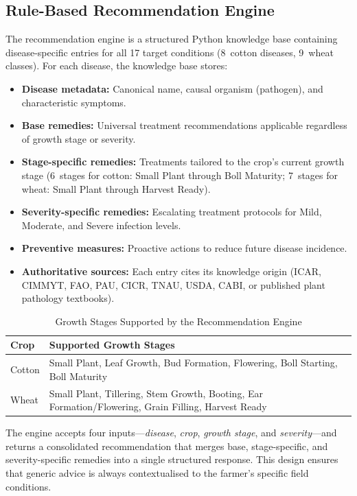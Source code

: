 \documentclass[12pt,a4paper]{report}
\begin{document}
\subsection{Rule-Based Recommendation Engine}
The recommendation engine is a structured Python knowledge base containing disease-specific entries for all 17 target conditions (8~cotton diseases, 9~wheat classes). For each disease, the knowledge base stores:

\begin{itemize}
    \item \textbf{Disease metadata:} Canonical name, causal organism (pathogen), and characteristic symptoms.
    \item \textbf{Base remedies:} Universal treatment recommendations applicable regardless of growth stage or severity.
    \item \textbf{Stage-specific remedies:} Treatments tailored to the crop's current growth stage (6~stages for cotton: Small Plant through Boll Maturity; 7~stages for wheat: Small Plant through Harvest Ready).
    \item \textbf{Severity-specific remedies:} Escalating treatment protocols for Mild, Moderate, and Severe infection levels.
    \item \textbf{Preventive measures:} Proactive actions to reduce future disease incidence.
    \item \textbf{Authoritative sources:} Each entry cites its knowledge origin (ICAR, CIMMYT, FAO, PAU, CICR, TNAU, USDA, CABI, or published plant pathology textbooks).
\end{itemize}

\begin{table}[H]
\centering
\caption{Growth Stages Supported by the Recommendation Engine}
\label{tab:growth-stages}
\begin{tabular}{lp{10.5cm}}
\toprule
Crop & Supported Growth Stages \\
\midrule
Cotton & Small Plant, Leaf Growth, Bud Formation, Flowering, Boll Starting, Boll Maturity \\
Wheat & Small Plant, Tillering, Stem Growth, Booting, Ear Formation/Flowering, Grain Filling, Harvest Ready \\
\bottomrule
\end{tabular}
\end{table}

The engine accepts four inputs---\textit{disease}, \textit{crop}, \textit{growth stage}, and \textit{severity}---and returns a consolidated recommendation that merges base, stage-specific, and severity-specific remedies into a single structured response. This design ensures that generic advice is always contextualised to the farmer's specific field conditions.
\end{document}
